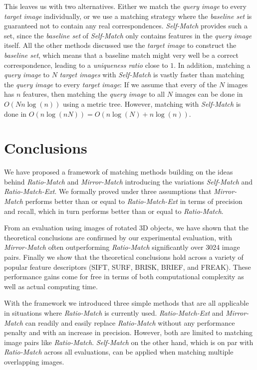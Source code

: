 \documentclass[review]{elsarticle}
\begin{document}
This leaves us with two alternatives. Either we match the \emph{query image} to every \emph{target image} individually, or we use a matching strategy where the \emph{baseline set} is guaranteed not to contain any real correspondences. \emph{Self-Match} provides such a set, since the \emph{baseline set} of \emph{Self-Match} only contains features in the \emph{query image} itself. All the other methods discussed use the \emph{target image} to construct the \emph{baseline set}, which means that a baseline match might very well be a correct correspondence, leading to a \emph{uniqueness ratio} close to $1$. In addition, matching a \emph{query image} to $N$ \emph{target images} with \emph{Self-Match} is vastly faster than matching the \emph{query image} to every \emph{target image}: If we assume that every of the $N$ images has $n$ features, then matching the \emph{query image} to all $N$ images can be done in $O(Nn\log(n))$ using a metric tree. However, matching with \emph{Self-Match} is done in $O(n\log(nN)) = O(n\log(N) + n\log(n))$.

\section{Conclusions}
\label{S:Summary}

We have proposed a framework of matching methods building on the ideas behind \emph{Ratio-Match} and \emph{Mirror-Match} introducing the variations \emph{Self-Match} and \emph{Ratio-Match-Ext}. We formally proved under three assumptions that \emph{Mirror-Match} performs better than or equal to \emph{Ratio-Match-Ext} in terms of precision and recall, which in turn performs better than or equal to \emph{Ratio-Match}.

From an evaluation using images of rotated 3D objects, we have shown that the theoretical conclusions are confirmed by our experimental evaluation, with \emph{Mirror-Match} often outperforming \emph{Ratio-Match} significantly over 3024 image pairs. Finally we show that the theoretical conclusions hold across a variety of popular feature descriptors (SIFT, SURF, BRISK, BRIEF, and FREAK). These performance gains come for free in terms of both computational complexity as well as actual computing time.

With the framework we introduced three simple methods that are all applicable in situations where \emph{Ratio-Match} is currently used.  \emph{Ratio-Match-Ext} and \emph{Mirror-Match} can readily and easily replace \emph{Ratio-Match} without any performance penalty and with an increase in precision.  However, both are limited to matching image pairs like \emph{Ratio-Match}. \emph{Self-Match} on the other hand, which is on par with \emph{Ratio-Match} across all evaluations, can be applied when matching multiple overlapping images. 
\end{document}
